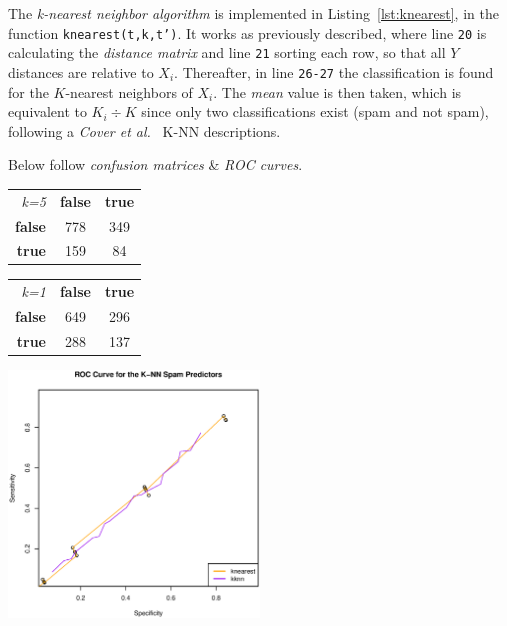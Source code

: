 \documentclass[a4paper, twocolumn]{article}
\begin{document}
    The \emph{k-nearest neighbor algorithm} is implemented in Listing~\ref{lst:knearest}, in the function \texttt{knearest(t,k,t')}. It works as previously described, where line \texttt{20} is calculating the \emph{distance matrix} and line \texttt{21} sorting each row, so that all $Y$ distances are relative to $X_i$. Thereafter, in line \texttt{26-27} the classification is found for the $K$-nearest neighbors of $X_i$. The \emph{mean} value is then taken, which is equivalent to $K_i \div K$ since only two classifications exist (spam and not spam), following a \emph{Cover et al.}~\cite{cover1967nearest} K-NN descriptions.

    Below follow \emph{confusion matrices} \& \emph{ROC curves}.

    \begin{table}[h]
    \begin{center}
    \begin{tabular}{r|c|c|}
        \multicolumn{1}{r}{\emph{k=5}}
        &\multicolumn{1}{c}{\textbf{false}}
        &\multicolumn{1}{c}{\textbf{true}} \\
        \cline{2-3}
        \textbf{false} & 778 & 349 \\
        \cline{2-3}
        \textbf{true} & 159 & 84 \\
        \cline{2-3}
    \end{tabular}
    \begin{tabular}{r|c|c|}
        \multicolumn{1}{r}{\emph{k=1}}
        &\multicolumn{1}{c}{\textbf{false}}
        &\multicolumn{1}{c}{\textbf{true}} \\
        \cline{2-3}
        \textbf{false} & 649 & 296 \\
        \cline{2-3}
        \textbf{true} & 288 & 137 \\
        \cline{2-3}
    \end{tabular}
    \end{center}
    \end{table}

    \includegraphics[width=0.5\textwidth]{share/spam.eps}
\end{document}
